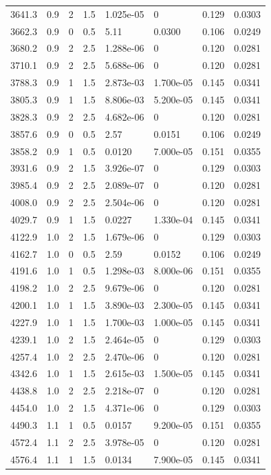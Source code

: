 \documentclass[preview]{standalone}
\begin{document}
{{\begin{tabular}{L{1.2cm}C{1.2cm} C{0.3cm}C{0.5cm} C{1.4cm}C{1.4cm} C{1.4cm}C{1.4cm}}
  3641.3  &   0.9  & 2     & 1.5 &  1.025e-05  & 0  & 0.129 &  0.0303   \\ 
  3662.3  &   0.9  & 0     & 0.5 &  5.11  & 0.0300  & 0.106 &  0.0249   \\ 
  3680.2  &   0.9  & 2     & 2.5 &  1.288e-06  & 0  & 0.120 &  0.0281   \\ 
  3710.1  &   0.9  & 2     & 2.5 &  5.688e-06  & 0  & 0.120 &  0.0281   \\ 
  3788.3  &   0.9  & 1     & 1.5 &  2.873e-03  & 1.700e-05  & 0.145 &  0.0341   \\ 
  3805.3  &   0.9  & 1     & 1.5 &  8.806e-03  & 5.200e-05  & 0.145 &  0.0341   \\ 
  3828.3  &   0.9  & 2     & 2.5 &  4.682e-06  & 0  & 0.120 &  0.0281   \\ 
  3857.6  &   0.9  & 0     & 0.5 &  2.57  & 0.0151  & 0.106 &  0.0249   \\ 
  3858.2  &   0.9  & 1     & 0.5 &  0.0120  & 7.000e-05  & 0.151 &  0.0355   \\ 
  3931.6  &   0.9  & 2     & 1.5 &  3.926e-07  & 0  & 0.129 &  0.0303   \\ 
  3985.4  &   0.9  & 2     & 2.5 &  2.089e-07  & 0  & 0.120 &  0.0281   \\ 
  4008.0  &   0.9  & 2     & 2.5 &  2.504e-06  & 0  & 0.120 &  0.0281   \\ 
  4029.7  &   0.9  & 1     & 1.5 &  0.0227  & 1.330e-04  & 0.145 &  0.0341   \\ 
  4122.9  &   1.0  & 2     & 1.5 &  1.679e-06  & 0  & 0.129 &  0.0303   \\ 
  4162.7  &   1.0  & 0     & 0.5 &  2.59  & 0.0152  & 0.106 &  0.0249   \\ 
  4191.6  &   1.0  & 1     & 0.5 &  1.298e-03  & 8.000e-06  & 0.151 &  0.0355   \\ 
  4198.2  &   1.0  & 2     & 2.5 &  9.679e-06  & 0  & 0.120 &  0.0281   \\ 
  4200.1  &   1.0  & 1     & 1.5 &  3.890e-03  & 2.300e-05  & 0.145 &  0.0341   \\ 
  4227.9  &   1.0  & 1     & 1.5 &  1.700e-03  & 1.000e-05  & 0.145 &  0.0341   \\ 
  4239.1  &   1.0  & 2     & 1.5 &  2.464e-05  & 0  & 0.129 &  0.0303   \\ 
  4257.4  &   1.0  & 2     & 2.5 &  2.470e-06  & 0  & 0.120 &  0.0281   \\ 
  4342.6  &   1.0  & 1     & 1.5 &  2.615e-03  & 1.500e-05  & 0.145 &  0.0341   \\ 
  4438.8  &   1.0  & 2     & 2.5 &  2.218e-07  & 0  & 0.120 &  0.0281   \\ 
  4454.0  &   1.0  & 2     & 1.5 &  4.371e-06  & 0  & 0.129 &  0.0303   \\ 
  4490.3  &   1.1  & 1     & 0.5 &  0.0157  & 9.200e-05  & 0.151 &  0.0355   \\ 
  4572.4  &   1.1  & 2     & 2.5 &  3.978e-05  & 0  & 0.120 &  0.0281   \\ 
  4576.4  &   1.1  & 1     & 1.5 &  0.0134  & 7.900e-05  & 0.145 &  0.0341   \\ 
\hline 
\end{tabular} 

}}
\end{document}
